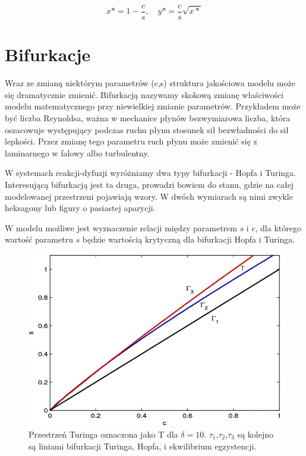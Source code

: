 $$ x* = 1 - \frac{c}{s}, \quad y* = \frac{c}{s}\sqrt{x*}$$

\section{Bifurkacje}

\noindent Wraz ze zmianą niektórym parametrów (c,s) struktura jakościowa modelu może się dramatycznie zmienić. Bifurkacją nazywamy skokową zmianę właściwości modelu matematycznego przy niewielkiej zmianie parametrów. Przykładem może być liczba Reynoldsa, ważna w mechanice płynów bezwymiarowa liczba, która oszacowuje występujący podczas ruchu płynu stosunek sił bezwładności do sił lepkości. Przez zmianę tego parametru ruch płynu może zmienić się z laminarnego w falowy albo turbulentny.

\noindent W systemach reakcji-dyfuzji wyróżniamy dwa typy bifurkacji - Hopfa i Turinga. Interesującą bifurkacją jest ta druga, prowadzi bowiem do stanu, gdzie na całej modelowanej przestrzeni pojawiają wzory. W dwóch wymiarach są nimi zwykle heksagony lub figury o pasiastej aparycji.

\noindent W modelu możliwe jest wyznaczenie relacji między parametrem $s$ i $c$, dla którego wartość parametru $s$ będzie wartością krytyczną dla bifurkacji Hopfa i Turinga.

\begin{figure}[h]
	\includegraphics[width=\textwidth]{img/plane}
	\centering 
	\caption{Przestrzeń Turinga oznaczona jako T dla $\delta=10$. $\tau_1$,$\tau_2$,$\tau_3$ są kolejno są liniami bifurkacji Turinga, Hopfa, i ekwilibrium egzystencji.}
\end{figure}

